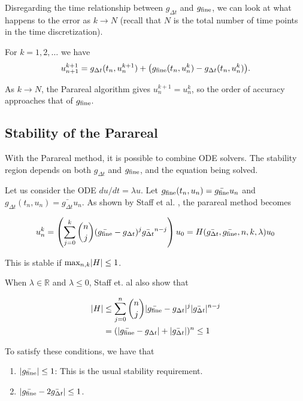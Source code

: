 \documentclass[letterpaper,12pt]{article}
\begin{document}
Disregarding the time relationship between $g_{\Delta t}$ and
$g_{\textnormal{fine}}$, we can look at what happens to the error as $k \to N$
(recall that $N$ is the total number of time points in the time discretization). 

For $k = 1, 2, \ldots$ we have 
\[u_{n+1}^{k+1} = g_{\Delta t} (t_n, u_n^{k+1}) + \big(
g_{\textnormal{fine}}(t_n, u_n^k) - g_{\Delta t}(t_n, u_n^k)\big). \]

As $k \to N$, the Parareal algorithm gives $u_{n}^{k+1} = u^k_n$, so the order
of accuracy approaches that of $g_{\textnormal{fine}}$. 

\subsection{Stability of the Parareal}

With the Parareal method, it is possible to combine ODE solvers. The stability region depends on both $g_{\Delta t}$ and $g_{\textnormal{fine}}$, and the
equation being solved. 

Let us consider the ODE $du/dt = \lambda u$. Let $g_{\textnormal{fine}}(t_n,
u_n) = \bar{g_{\textnormal{fine}}}u_n$ and $g_{\Delta t}(t_n, u_n) =
\bar{g_{\Delta t}} u_n$. As shown by Staff et al. \cite{staff2005stability}, the parareal method becomes 

\[ u_n^k = \left( \sum_{j=0}^k {n \choose j} (\bar{g_{\textnormal{fine}}} -
g_{\Delta t})^j \bar{g_{\Delta t}}^{n-j} \right) u_0 = H(\bar{g_{\Delta
t}}, \bar{g_{\textnormal{fine}}}, n, k, \lambda)u_0 \]

This is stable if $\textnormal{max}_{n, k} |H| \leq 1$. 

When $\lambda \in \mathbb{R}$ and $\lambda \leq 0$, Staff et. al also show that

\[
    \begin{aligned}
    |H| &\leq \sum_{j=0}^n {n \choose j} |\bar{g_{\textnormal{fine}}} -
    g_{\Delta t}|^j |\bar{g_{\Delta t}}|^{n-j} \\
    &= (|\bar{g_{\textnormal{fine}}} - g_{\Delta t}| + |\bar{g_{\Delta
    t}}|)^n \leq 1
    \end{aligned}
\]

To satisfy these conditions, we have that 
\begin{enumerate}
    \item $| \bar{g_{\textnormal{fine}}} | \leq 1$: This is the usual stability
        requirement.
    \item $|\bar{g_{\textnormal{fine}}} - 2 \bar{g_{\Delta t}}| \leq 1$.
\end{enumerate}
\end{document}
